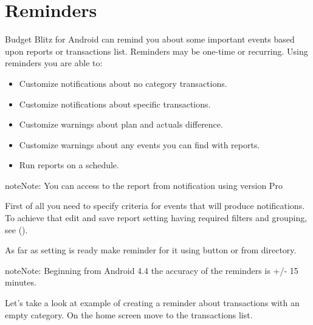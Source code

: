 \documentclass[a4paper,10pt,english]{sphinxmanual}
\begin{document}
\noindent{}


\chapter{Reminders}
\label{\detokenize{reminders:reminders}}\label{\detokenize{reminders:chapter-reminders}}\label{\detokenize{reminders::doc}}
Budget Blitz for Android can remind you about some important events based upon reports or transactions list. Reminders
may be one-time or recurring. Using reminders you are able to:
\begin{itemize}
\item {} 
Customize notifications about no category transactions.

\item {} 
Customize notifications about specific transactions.

\item {} 
Customize warnings about plan and actuals difference.

\item {} 
Customize warnings about any events you can find with reports.

\item {} 
Run reports on a schedule.

\end{itemize}

\begin{sphinxadmonition}{note}{Note:}
You can access to the report from notification using version Pro
\end{sphinxadmonition}

First of all you need to specify criteria for events that will produce notifications.
To achieve that edit and save report setting having required filters and grouping, see
{\hyperref[\detokenize{shortcuts:chapter-shortcuts}]{}} ().

As far as setting is ready make reminder for it using  button or from 
directory.

\begin{sphinxadmonition}{note}{Note:}
Beginning from Android 4.4 the accuracy of the reminders is +/- 15 minutes.
\end{sphinxadmonition}

Let’s take a look at example of creating a reminder about transactions with an empty category.
On the home screen move to the transactions list.
\end{document}
